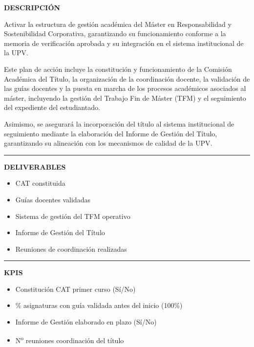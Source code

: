 \documentclass[11pt,a4paper]{scrreprt}
\newcommand{\fieldlabel}[1]{%
  {\footnotesize\sffamily\bfseries\color{mutedcolor}\MakeUppercase{#1}}\par\nopagebreak[4]
}
\newcommand{\fieldsep}{\vspace{3pt}\noindent\textcolor{bordercolor}{\rule{\linewidth}{0.4pt}}\vspace{3pt}\par}
\begin{document}
\begin{tcolorbox}[pabox={aacolor}{PA2.2 \enspace\textbullet\enspace Activación de la gestión académica del Máster en Responsabilidad y Sostenibilidad Corporativa}]

\fieldlabel{Descripci\'on}
{\small Activar la estructura de gestión académica del Máster en Responsabilidad y Sostenibilidad Corporativa, garantizando su funcionamiento conforme a la memoria de verificación aprobada y su integración en el sistema institucional de la UPV. 

Este plan de acción incluye la constitución y funcionamiento de la Comisión Académica del Título, la organización de la coordinación docente, la validación de las guías docentes y la puesta en marcha de los procesos académicos asociados al máster, incluyendo la gestión del Trabajo Fin de Máster (TFM) y el seguimiento del expediente del estudiantado. 

Asimismo, se asegurará la incorporación del título al sistema institucional de seguimiento mediante la elaboración del Informe de Gestión del Título, garantizando su alineación con los mecanismos de calidad de la UPV. }\par
\fieldsep
\fieldlabel{Deliverables}
{\small \begin{itemize}[noitemsep,topsep=2pt]
\item CAT constituida
\item Guías docentes validadas
\item Sistema de gestión del TFM operativo
\item Informe de Gestión del Título
\item Reuniones de coordinación realizadas
\end{itemize}}\par
\fieldsep
\fieldlabel{KPIs}
{\small \begin{itemize}[noitemsep,topsep=2pt]
\item Constitución CAT primer curso (Sí/No)
\item \% asignaturas con guía validada antes del inicio (100\%)
\item Informe de Gestión elaborado en plazo (Sí/No)
\item N\textsuperscript{o} reuniones coordinación del título
\end{itemize}}\par
\end{tcolorbox}
\end{document}
